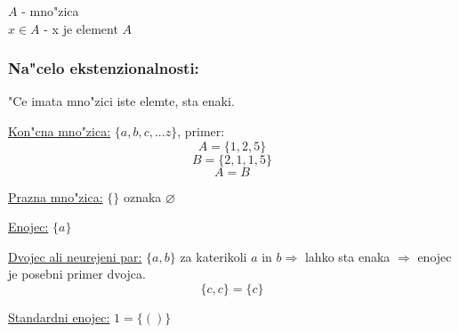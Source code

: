 \(A\) - mno"zica\\
\(x \in A\) - x je element \(A\)

\subsubsection*{Na"celo ekstenzionalnosti:} 
"Ce imata mno"zici iste elemte, sta enaki.

\underline{Kon"cna mno"zica:} \(\{a, b, c, ... z\}\), primer:
\[A=\{1, 2, 5\}\]
\[B = \{2, 1, 1, 5\}\]
\[A = B\]

\underline{Prazna mno"zica:} \(\{\}\) oznaka \(\varnothing \)

\underline{Enojec:} \(\{a\}\)

\underline{Dvojec ali neurejeni par:} \(\{a, b\}\) za katerikoli \(a\) in \(b \Rightarrow\) lahko sta enaka \(\Rightarrow\) enojec je posebni primer dvojca.
\[\{c, c\} = \{c\}\]

\underline{Standardni enojec:} \(1 = \{()\}\)
